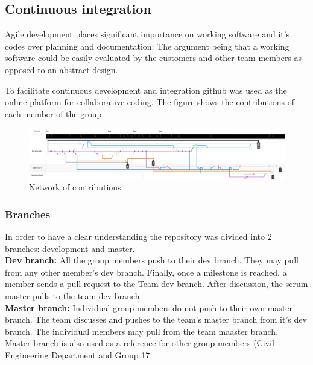 \documentclass[12pt]{article}
\begin{document}
\subsection{Continuous integration}
Agile development places significant importance on working software and it's codes over planning and documentation: The argument being that a working software could be easily evaluated by the customers and other team members as opposed to an abstract design.

To facilitate continuous development and integration github was used as the online platform for collaborative coding. The figure shows the contributions of each member of the group.\\


\begin{figure}[H]
    \centering
    \includegraphics[width=\textwidth]{images/canvas.png}
    \caption{Network of contributions}
    \label{fig:groups}
\end{figure}

\subsubsection{Branches}
In order to have a clear understanding the repository was divided into 2 branches: development and master. \\

\textbf{Dev branch: } All the group members push to their dev branch. They may pull from any other member's dev branch. Finally, once a milestone is reached, a member sends a pull request to the Team dev branch. After discussion, the scrum master pulls to the team dev branch.\\

\textbf{Master branch: } Individual group members do not push to their own master branch. The team discusses and pushes to the team's master branch from it's dev branch. The individual members may pull from the team maaster branch.\\
Master branch is also used as a reference for other group members (Civil Engineering Department and Group 17.\\
\end{document}
